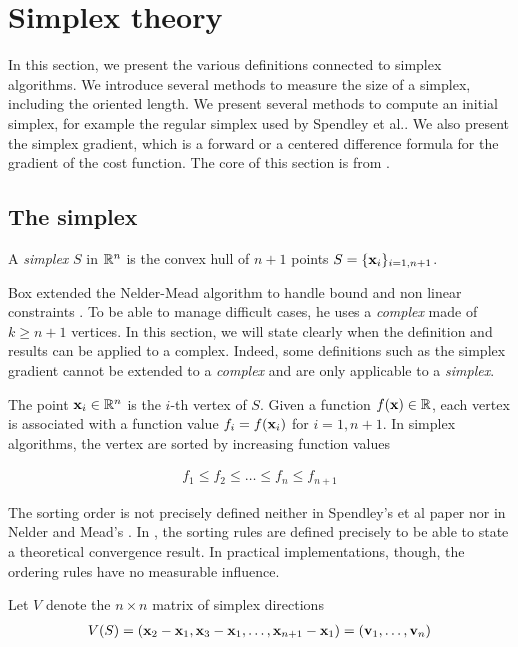 \chapter{Simplex theory}

In this section, we present the various definitions connected
to simplex algorithms. We introduce several methods to measure 
the size of a simplex, including the oriented length. 
We present several methods to compute an
initial simplex, for example the regular simplex used by Spendley et al..
We also present the simplex gradient, which is a forward or a centered 
difference formula for the gradient of the cost function.
The core of this section is from \cite{Kelley1999}.

\section{The simplex}

A \emph{simplex} $S$ in $\mathbb{R}^n$ is the convex hull of $n+1$ points $S=\{\mathbf{x}_i\}_{i=1,n+1}$.

Box extended the Nelder-Mead algorithm to handle bound and non linear constraints \cite{Box1965}.
To be able to manage difficult cases, he uses a \emph{complex} made of $k\geq n+1$ vertices.
In this section, we will state clearly when the definition and results can be applied to a complex. 
Indeed, some definitions such as the simplex gradient cannot be extended to a \emph{complex}
and are only applicable to a \emph{simplex}.

The point $\mathbf{x}_i\in\mathbb{R}^n$ is the $i$-th vertex of $S$. Given a function $f(\mathbf{x})\in\mathbb{R}$,
each vertex is associated with a function value $f_i = f(\mathbf{x}_i)$ for $i=1,n+1$.
In simplex algorithms, the vertex are sorted by increasing function values 

\begin{eqnarray}
\label{simplex-sortedfv}
f_1 \leq f_2 \leq \ldots \leq f_n \leq f_{n+1}
\end{eqnarray}

The sorting order is not precisely defined neither in Spendley's et al paper \cite{Spendley1962}
nor in Nelder and Mead's \cite{citeulike:3009487}. 
In \cite{lagarias:112}, the sorting rules are defined precisely to be able to 
state a theoretical convergence result. In practical implementations, though, the 
ordering rules have no measurable influence.

Let $V$ denote the $n\times n$ matrix of simplex directions 
\begin{eqnarray}
\label{simplex-directions}
V(S) = (\mathbf{x}_2 - \mathbf{x}_1, \mathbf{x}_3 - \mathbf{x}_1 , \ldots , \mathbf{x}_{n+1} - \mathbf{x}_1) = (\mathbf{v}_1, \ldots , \mathbf{v}_n)
\end{eqnarray}

